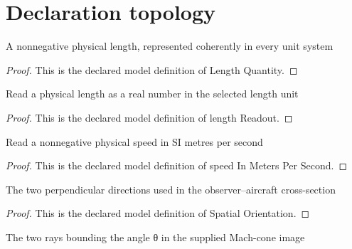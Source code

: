 \section{Declaration topology}
\begin{definition}
  \label{def:physics:phyx-mini-0220:phyxminiproblems-problemphyxmini0220-lengthquantity}
  A nonnegative physical length, represented coherently in every unit system
\end{definition}
\begin{proof}
  This is the declared model definition of Length Quantity.
\end{proof}
\begin{definition}
  \label{def:physics:phyx-mini-0220:phyxminiproblems-problemphyxmini0220-lengthreadout}
  Read a physical length as a real number in the selected length unit
\end{definition}
\begin{proof}
  This is the declared model definition of length Readout.
\end{proof}
\begin{definition}
  \label{def:physics:phyx-mini-0220:phyxminiproblems-problemphyxmini0220-speedinmeterspersecond}
  Read a nonnegative physical speed in SI metres per second
\end{definition}
\begin{proof}
  This is the declared model definition of speed In Meters Per Second.
\end{proof}
\begin{definition}
  \label{def:physics:phyx-mini-0220:phyxminiproblems-problemphyxmini0220-spatialorientation}
  The two perpendicular directions used in the observer--aircraft cross-section
\end{definition}
\begin{proof}
  This is the declared model definition of Spatial Orientation.
\end{proof}
\begin{definition}
  \label{def:physics:phyx-mini-0220:phyxminiproblems-problemphyxmini0220-machconeray}
  The two rays bounding the angle θ in the supplied Mach-cone image
\end{definition}
